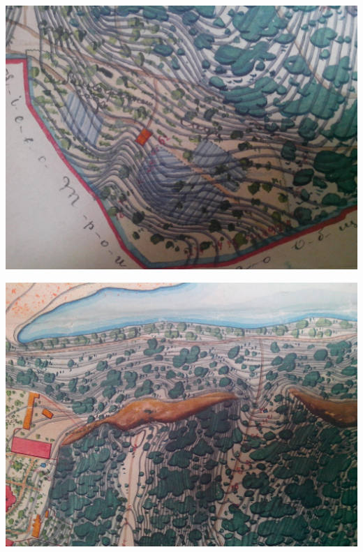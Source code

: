 \begin{center}
\includegraphics[width=\linewidth]{chast-vosp/zver/IMG_20170627_153959.jpg}
\end{center}

\begin{center}
\includegraphics[width=\linewidth]{chast-vosp/zver/IMG_20170627_154014.jpg}
\end{center}

\newpage

\vspace*{\fill}

